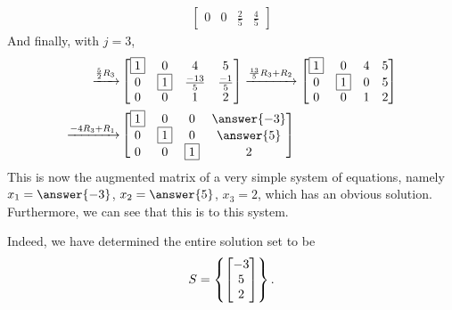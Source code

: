 \documentclass{ximera}
\begin{document}
\begin{example}
\begin{align*}
\begin{bmatrix}
                   0&0&\frac{2}{5}&\frac{4}{5}
                 \end{bmatrix}
  \end{align*}
  And finally, with $j=3$,
  \begin{align*}
    \xrightarrow{\rowopmult{\frac{5}{2}}{3}}
    &
      \begin{bmatrix}
        \leading{1}&0&4&5\\
        0&\leading{1}&\frac{-13}{5}&\frac{-1}{5}\\
        0&0&1&2
      \end{bmatrix}
               \xrightarrow{\rowopadd{\frac{13}{5}}{3}{2}}
               \begin{bmatrix}
                 \leading{1}&0&4&5\\
                 0&\leading{1}&0&5\\
                 0&0&1&2
               \end{bmatrix}\\
    \xrightarrow{\rowopadd{-4}{3}{1}}
    &
      \begin{bmatrix}
        \leading{1}&0&0&\answer{-3}\\
        0&\leading{1}&0&\answer{5}\\
        0&0&\leading{1}&2
      \end{bmatrix}
  \end{align*}
  This is now the augmented matrix of a very simple system of equations, namely $x_1=\answer{-3}$, $x_2=\answer{5}$, $x_3=2$, which has an obvious solution.  Furthermore, we can see that this is  to this system.

  \begin{feedback}[correct]
    Indeed, we have determined the entire solution set to be
    \[
      S=\left\{\begin{bmatrix}-3\\5\\2\end{bmatrix}\right\}.
    \]
  \end{feedback}

\end{example}
\end{document}
